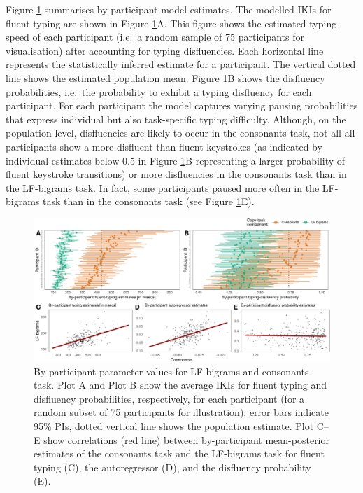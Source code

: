 \documentclass[
  english,
  man,mask,floatsintext]{apa7}
\begin{document}
Figure \ref{fig:parameters} summarises by-participant model estimates. The modelled IKIs for fluent typing are shown in Figure \ref{fig:parameters}A. This figure shows the estimated typing speed of each participant (i.e.~a random sample of 75 participants for visualisation) after accounting for typing disfluencies. Each horizontal line represents the statistically inferred estimate for a participant. The vertical dotted line shows the estimated population mean. Figure \ref{fig:parameters}B shows the disfluency probabilities, i.e.~the probability to exhibit a typing disfluency for each participant. For each participant the model captures varying pausing probabilities that express individual but also task-specific typing difficulty. Although, on the population level, disfluencies are likely to occur in the consonants task, not all all participants show a more disfluent than fluent keystrokes (as indicated by individual estimates below 0.5 in Figure \ref{fig:parameters}B representing a larger probability of fluent keystroke transitions) or more disfluencies in the consonants task than in the LF-bigrams task. In fact, some participants paused more often in the LF-bigrams task than in the consonants task (see Figure \ref{fig:parameters}E).

\begin{landscape}
\begin{figure}[bp!]

{\centering \includegraphics{report_v2_files/figure-latex/parameters-1} 

}

\caption{By-participant parameter values for LF-bigrams and consonants task. Plot A and Plot B show the average IKIs for fluent typing and disfluency probabilities, respectively, for each participant (for a random subset of 75 participants for illustration); error bars indicate 95\% PIs, dotted vertical line shows the population estimate. Plot C--E show correlations (red line) between by-participant mean-posterior estimates of the consonants task and the LF-bigrams task for fluent typing (C), the autoregressor (D), and the disfluency probability (E).}\label{fig:parameters}
\end{figure}
\end{landscape}
\end{document}
